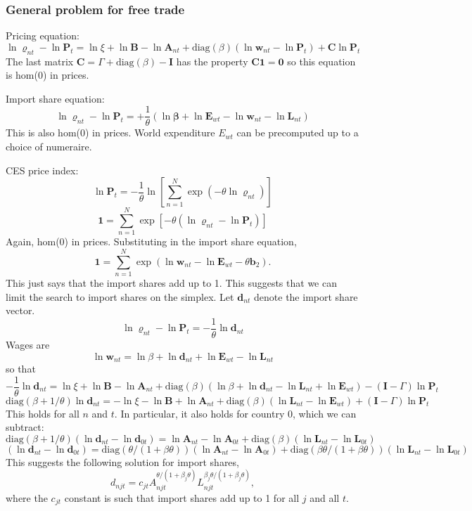 \documentclass[12pt]{article}
\begin{document}
\subsubsection{General problem for free trade}
Pricing equation:
\[
\ln\mathbf \varrho_{nt}-\ln\mathbf P_{t} = 
\ln\xi
	+ \ln\mathbf B
	- \ln\mathbf A_{nt}
+\text{diag}(\beta)(\ln\mathbf w_{nt}-\ln\mathbf P_{t})
+ \mathbf C \ln\mathbf P_{t}  
\]
The last matrix $\mathbf C = \Gamma+\text{diag}(\beta)-\mathbf I$ has the property $\mathbf C\mathbf 1=\mathbf 0$ so this equation is hom(0) in prices. 

Import share equation:
\[
\ln\mathbf \varrho_{nt} - \ln\mathbf P_{t} 
 = 
 	+\frac1\theta(\ln\mathbf\beta+\ln \mathbf E_{wt}-\ln \mathbf w_{nt}- \ln \mathbf L_{nt})
\]
This is also hom(0) in prices. World expenditure $E_{wt}$ can be precomputed up to a choice of numeraire.

CES price index:
\[
\ln\mathbf P_{t} = -\frac1\theta
 \ln \left[
 	\sum_{n=1}^N \exp(-\theta \ln \varrho_{nt})
 \right]
\]
\[
\mathbf 1 =  
 	\sum_{n=1}^N \exp[-\theta (\ln \varrho_{nt}-\ln\mathbf P_{t})]
\]
Again, hom(0) in prices. Substituting in the import share equation,
\[
\mathbf 1 =  
 	\sum_{n=1}^N \exp(\ln\mathbf w_{nt}-\ln\mathbf E_{wt}-\theta\mathbf b_2).
\]
This just says that the import shares add up to 1. This suggests that we can limit the search to import shares on the simplex. Let $\mathbf d_{nt}$ denote the import share vector.
\[
\ln\mathbf \varrho_{nt} - \ln\mathbf P_{t} 
 = -\frac1\theta \ln\mathbf d_{nt}
\]
Wages are
\[
\ln\mathbf w_{nt} = \ln\beta+\ln\mathbf d_{nt}+\ln\mathbf E_{wt}-\ln\mathbf L_{nt}
\]
so that
\[
-\frac1\theta \ln\mathbf d_{nt} = 
\ln\xi
	+ \ln\mathbf B
	- \ln\mathbf A_{nt}
+
\text{diag}(\beta)(\ln\beta+\ln\mathbf d_{nt}-\ln\mathbf L_{nt}+\ln\mathbf E_{wt})
- (\mathbf I-\Gamma) \ln\mathbf P_{t}  
\]
\[
\text{diag}(\beta+1/\theta) \ln\mathbf d_{nt} = 
-\ln\xi
	- \ln\mathbf B
	+ \ln\mathbf A_{nt}
+
\text{diag}(\beta)(\ln\mathbf L_{nt}-\ln\mathbf E_{wt})
+ (\mathbf I-\Gamma) \ln\mathbf P_{t}  
\]
This holds for all $n$ and $t$. In particular, it also holds for country $0$, which we can subtract:
\[
\text{diag}(\beta+1/\theta) (\ln\mathbf d_{nt}-\ln\mathbf d_{0t}) = 
	\ln\mathbf A_{nt}-\ln\mathbf A_{0t}
+
\text{diag}(\beta)(\ln\mathbf L_{nt}-\ln\mathbf L_{0t})
\]
\[
(\ln\mathbf d_{nt}-\ln\mathbf d_{0t}) = 
	\text{diag}(\theta/(1+\beta\theta)) (\ln\mathbf A_{nt}-\ln\mathbf A_{0t})
+
\text{diag}(\beta\theta/(1+\beta\theta))(\ln\mathbf L_{nt}-\ln\mathbf L_{0t})
\]
This suggests the following solution for import shares,
\[
d_{njt} = c_{jt}A_{njt}^{\theta/(1+\beta_j\theta)}L_{njt}^{\beta_j\theta/(1+\beta_j\theta)},
\]
where the $c_{jt}$ constant is such that import shares add up to 1 for all $j$ and all $t$.
\end{document}
